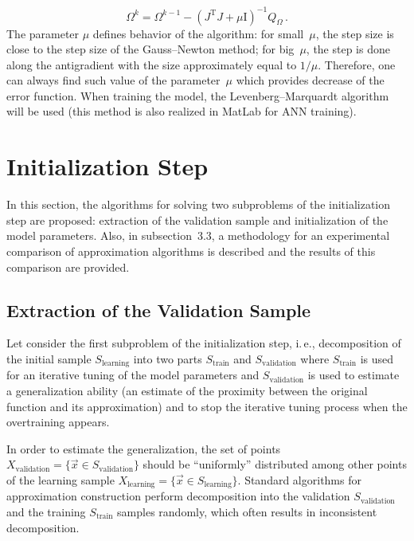 \begin{multicols}{2}
{}
\begin{equation}
  \label{lm}
  \Omega^k = \Omega^{k-1} - \left( { J}^{\mathrm{T}} { J} + \mu \mathrm{I} \right)^{-1} Q_\Omega\,.
\end{equation}
The parameter $\mu$ defines behavior of the algorithm:
for small~$\mu$, the step size is close to the step size of the Gauss--Newton 
method; for big~$\mu$, the step is done along the antigradient with the size 
approximately equal to ${1}/{\mu}$.
Therefore, one can always find such value of the parameter~$\mu$ which provides decrease of the error function. 
When training the model, the Levenberg--Marquardt algorithm will be used (this method is 
also realized in MatLab for ANN training).

\section{Initialization Step}
\label{stage1}

\noindent
In this section, the algorithms for solving two subproblems of the initialization step
are proposed:
extraction of the validation sample and initialization of the model parameters.
Also, in subsection~3.3,  a methodology for an experimental comparison 
of approximation algorithms is described and the results of this comparison
are provided.

\subsection{Extraction of the Validation Sample}
\label{divideSample}

\noindent
Let consider the first subproblem of the initialization step, i.\,e., 
decomposition of the initial sample 
$S_{\mathrm{learning}}$ into two parts $S_{\mathrm{train}}$ and $S_{\mathrm{validation}}$ where
$S_{\mathrm{train}}$ is used for an iterative tuning of the model parameters and $S_{\mathrm{validation}}$ is used 
to estimate a generalization ability (an estimate of the proximity between the original function 
and its approximation) and to stop the iterative tuning process when the overtraining 
appears.

In order to estimate the generalization, the set of points
$X_{\mathrm{validation}} = \{\vec x \in S_{\mathrm{validation}}\}$ should be ``uniformly'' 
distributed among other points of the learning sample 
$X_{\mathrm{learning}} = \{\vec x \in S_{\mathrm{learning}}\}$.
Standard algorithms for approximation construction perform decomposition into the validation
 $S_{\mathrm{validation}}$ and the training $S_{\mathrm{train}}$ samples randomly, which often results in 
 inconsistent decomposition.


\end{multicols}
